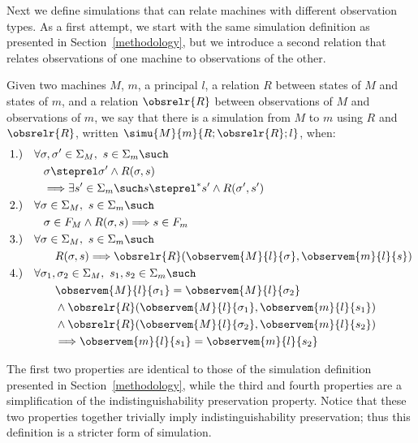 Next we define simulations that can relate machines with different 
observation types. As a first attempt, we start with the same 
simulation definition as presented in Section~\ref{methodology}, but 
we introduce a second relation that relates observations of one machine 
to observations of the other.

\begin{definition}
Given two machines $M$, $m$, a principal $l$, a relation $R$ between
states of $M$ and states of $m$, and a relation $\obsrelr{R}$ between
observations of $M$ and observations of $m$, we say that there is a
simulation from $M$ to $m$ using $R$ and $\obsrelr{R}$,
written $\simu{M}{m}{R;\obsrelr{R};l}$, when:
{\small
\begin{align*}
& 1.) \quad \forall \sigma, \sigma' \in \Sigma_M, \,\, s \in \Sigma_m \such \\
& \qquad \quad \sigma \steprel \sigma' \land R(\sigma,s) \\
& \qquad \quad \Longrightarrow 
\exists s' \in \Sigma_m \such s \steprel^* s' \land R(\sigma',s') \\
& 2.) \quad \forall \sigma \in \Sigma_M, \,\, s \in \Sigma_m \such \\
& \qquad \quad \sigma \in F_M \land R(\sigma,s) \Longrightarrow s \in F_m \\
& 3.) \quad \forall \sigma \in \Sigma_M, \,\, s \in \Sigma_m \such \\
& \qquad \qquad R(\sigma,s) \Longrightarrow \obsrelr{R}(\observem{M}{l}{\sigma},\observem{m}{l}{s}) \\
& 4.) \quad \forall \sigma_1, \sigma_2 \in \Sigma_M, \,\, s_1, s_2 \in \Sigma_m \such \\
& \qquad \qquad \observem{M}{l}{\sigma_1} = \observem{M}{l}{\sigma_2} \\
& \qquad \qquad \land \obsrelr{R}(\observem{M}{l}{\sigma_1},\observem{m}{l}{s_1}) \\
& \qquad \qquad \land \obsrelr{R}(\observem{M}{l}{\sigma_2},\observem{m}{l}{s_2}) \\
& \qquad \qquad \Longrightarrow \observem{m}{l}{s_1} = \observem{m}{l}{s_2}
\end{align*}}
\end{definition}

\noindent{}The first two properties are identical to those of the simulation
definition presented in Section~\ref{methodology}, while the third and
fourth properties are a simplification of the indistinguishability
preservation property. Notice that these two properties together trivially 
imply indistinguishability preservation; thus this definition is a
stricter form of simulation.

